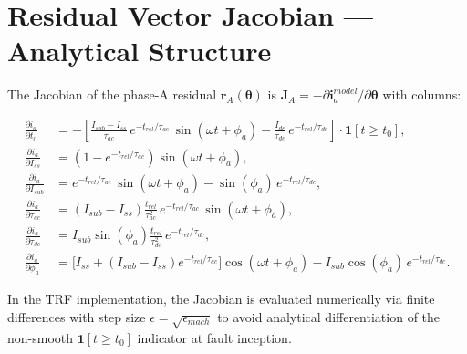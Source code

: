 \documentclass[12pt, a4paper]{article}
\theoremstyle{definition}
\theoremstyle{plain}
\newcommand{\vect}[1]{\bm{#1}}
\newcommand{\mat}[1]{\mathbf{#1}}
\begin{document}
\section{Residual Vector Jacobian — Analytical Structure}
\label{app:jacobian}

The Jacobian of the phase-A residual $\vect{r}_A(\vect{\theta})$ is
$\mat{J}_A = -\partial \vect{i}_a^{model}/\partial \vect{\theta}$ with columns:

\begin{align}
  \frac{\partial i_a}{\partial t_0} &= -\left[
    \frac{I_{sub} - I_{ss}}{\tau_{ac}}\,e^{-t_{rel}/\tau_{ac}}\,\sin(\omega t + \phi_a)
    - \frac{I_{dc}}{\tau_{dc}}\,e^{-t_{rel}/\tau_{dc}}
  \right] \cdot \mathbf{1}[t \geq t_0], \\[4pt]
  \frac{\partial i_a}{\partial I_{ss}} &= \left(1 - e^{-t_{rel}/\tau_{ac}}\right)
    \sin(\omega t + \phi_a), \\[4pt]
  \frac{\partial i_a}{\partial I_{sub}} &= e^{-t_{rel}/\tau_{ac}}\,\sin(\omega t + \phi_a)
    - \sin(\phi_a)\,e^{-t_{rel}/\tau_{dc}}, \\[4pt]
  \frac{\partial i_a}{\partial \tau_{ac}} &= (I_{sub} - I_{ss})
    \frac{t_{rel}}{\tau_{ac}^2}\,e^{-t_{rel}/\tau_{ac}}\,\sin(\omega t + \phi_a), \\[4pt]
  \frac{\partial i_a}{\partial \tau_{dc}} &= I_{sub}\sin(\phi_a)
    \frac{t_{rel}}{\tau_{dc}^2}\,e^{-t_{rel}/\tau_{dc}}, \\[4pt]
  \frac{\partial i_a}{\partial \phi_a} &= \bigl[I_{ss} + (I_{sub} - I_{ss})
    e^{-t_{rel}/\tau_{ac}}\bigr]\cos(\omega t + \phi_a)
    - I_{sub}\cos(\phi_a)\,e^{-t_{rel}/\tau_{dc}}.
\end{align}

In the TRF implementation, the Jacobian is evaluated numerically via
finite differences with step size $\epsilon = \sqrt{\epsilon_{mach}}$
to avoid analytical differentiation of the non-smooth $\mathbf{1}[t \geq t_0]$
indicator at fault inception.

\newpage

\end{document}

